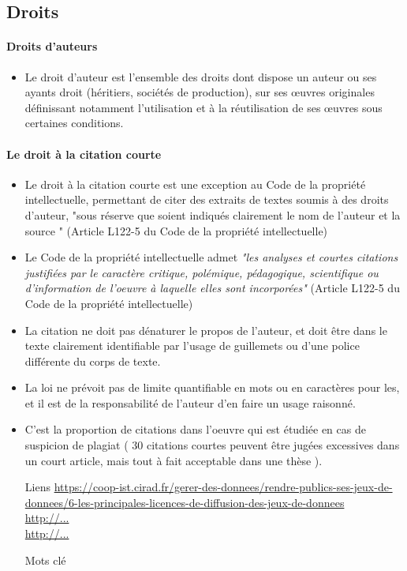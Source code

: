 \documentclass{book}
\newenvironment{titlemize}[1]{%
  \paragraph{#1}
  \begin{itemize}}
  {\end{itemize}}
\begin{document}
\subsection{Droits}
\begin{titlemize}{Droits d'auteurs}
    \item Le droit d’auteur est l’ensemble des droits dont dispose un auteur ou ses ayants droit (héritiers, sociétés de production), sur ses œuvres originales définissant notamment l'utilisation et à la réutilisation de ses œuvres sous certaines conditions.
\end{titlemize}
\begin{titlemize}{Le droit à la citation courte}\label{droit_citation_courte}
    \item Le droit à la citation courte est une exception au Code de la propriété intellectuelle, permettant de citer des extraits de textes soumis à des droits d'auteur, "sous réserve que soient indiqués clairement le nom de l'auteur et la source " (Article L122-5 du Code de la propriété intellectuelle)
    \item Le Code de la propriété intellectuelle admet \textit{"les analyses et courtes citations justifiées par le caractère critique, polémique, pédagogique, scientifique ou d'information de l'oeuvre à laquelle elles sont incorporées"}  (Article L122-5 du Code de la propriété intellectuelle)
    \item La citation ne doit pas dénaturer le propos de l'auteur, et doit être dans le texte clairement identifiable par l'usage de guillemets ou d'une police différente du corps de texte.
    \item La loi ne prévoit pas de limite quantifiable en mots ou en caractères pour les, et il est de la responsabilité de l'auteur d'en faire un usage raisonné.
    \item C'est la proportion de citations dans l'oeuvre qui est étudiée en cas de suspicion de plagiat ( 30 citations courtes peuvent être jugées excessives dans un court article, mais tout à fait acceptable dans une thèse ).  
    
\end{titlemize}
\begin{itemize}
    \item [Liens]
        \url{https://coop-ist.cirad.fr/gerer-des-donnees/rendre-publics-ses-jeux-de-donnees/6-les-principales-licences-de-diffusion-des-jeux-de-donnees}\\
        \url{http://...}\\
        \url{http://...}\\
    \item [Mots clé]
\end{itemize}
\end{document}

